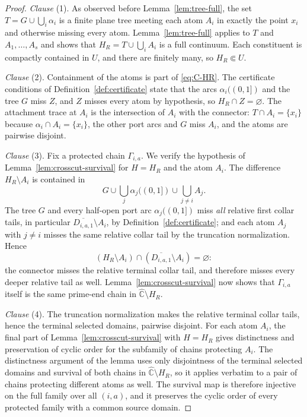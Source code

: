 \documentclass[11pt,reqno]{amsart}
\theoremstyle{definition}
\theoremstyle{remark}
\newcommand{\Chat}{\widehat{\mathbb C}}
\begin{document}
\begin{proof}
\emph{Clause} (1).  As observed before Lemma~\ref{lem:tree-full}, the set
$T=G\cup\bigcup_i\alpha_i$ is a finite plane tree meeting each atom $A_i$
in exactly the point $x_i$ and otherwise missing every atom.
Lemma~\ref{lem:tree-full} applies to $T$ and $A_1,\dots,A_s$ and shows
that $H_R=T\cup\bigcup_iA_i$ is a full continuum.  Each constituent is
compactly contained in $U$, and there are finitely many, so
$H_R\Subset U$.

\emph{Clause} (2).  Containment of the atoms is part of
\eqref{eq:C-HR}.  The certificate conditions of
Definition~\ref{def:certificate} state that the arcs
$\alpha_i((0,1])$ and the tree $G$ miss $Z$, and $Z$ misses every atom by
hypothesis, so $H_R\cap Z=\varnothing$.  The attachment trace at $A_i$ is
the intersection of $A_i$ with the connector: $T\cap A_i=\{x_i\}$ because
$\alpha_i\cap A_i=\{x_i\}$, the other port arcs and $G$ miss $A_i$, and
the atoms are pairwise disjoint.

\emph{Clause} (3).  Fix a protected chain $\Gamma_{i,a}$.  We verify the
hypothesis of Lemma~\ref{lem:crosscut-survival} for $H=H_R$ and the atom
$A_i$.  The difference $H_R\setminus A_i$ is contained in
\[
G\cup\bigcup_j\alpha_j((0,1])\cup\bigcup_{j\ne i}A_j .
\]
The tree $G$ and every half-open port arc $\alpha_j((0,1])$ miss
\emph{all} relative first collar tails, in particular
$\overline{D_{i,a,1}}\setminus A_i$, by
Definition~\ref{def:certificate}; and each atom $A_j$ with $j\ne i$
misses the same relative collar tail by the truncation
normalization.  Hence
\[
(H_R\setminus A_i)\cap
(\overline{D_{i,a,1}}\setminus A_i)=\varnothing:
\]
the connector misses the relative terminal collar tail, and therefore
misses every deeper relative tail as well.
Lemma~\ref{lem:crosscut-survival} now shows that
$\Gamma_{i,a}$ itself is the same prime-end chain in
$\Chat\setminus H_R$.

\emph{Clause} (4).  The truncation normalization makes the relative
terminal collar tails, hence the terminal selected domains, pairwise
disjoint.  For
each atom $A_i$, the final part of Lemma~\ref{lem:crosscut-survival}
with $H=H_R$ gives distinctness and preservation of cyclic order for the
subfamily of chains protecting $A_i$.  The distinctness argument of the
lemma uses only disjointness of the terminal selected domains and
survival of both chains in $\Chat\setminus H_R$, so it applies verbatim
to a pair of chains protecting different atoms as well.  The survival
map is therefore injective on the full family over all $(i,a)$, and it
preserves the cyclic order of every protected family with a common
source domain.


\end{proof}
\end{document}
